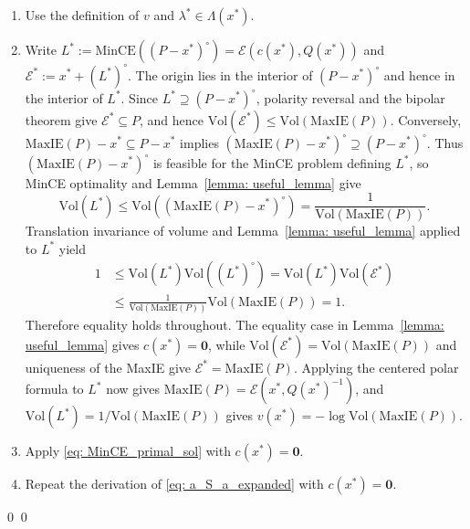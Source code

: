 \documentclass[smallextended]{svjour3}
\let\springerproof\proof
\let\endspringerproof\endproof
\renewenvironment{proof}{\springerproof}{%
  \ifhmode\qed\else\leavevmode\qed\fi\endspringerproof}
\newcommand{\V}{{\mathrm{Vol}}}
\newcommand{\E}{\mathcal{E}}
\newcommand{\MaxIE}{\mathrm{MaxIE}}
\begin{document}
\begin{proof}
\begin{enumerate}
    \item Use the definition of $v$ and $\lambda^*\in\Lambda(x^*)$.
    \item Write $ L^*:=\mathrm{MinCE}((P-x^*)^\circ)=\E(c(x^*),Q(x^*))$ and $\E^*:=x^*+(L^*)^\circ$.
    The origin lies in the interior of $(P-x^*)^\circ$ and hence in the
    interior of $L^*$.
    Since $L^*\supseteq(P-x^*)^\circ$, polarity reversal and the bipolar
    theorem give $\E^*\subseteq P$, and hence
    $\V(\E^*)\leq\V(\MaxIE(P))$. Conversely,
    $\MaxIE(P)-x^*\subseteq P-x^*$ implies
    $(\MaxIE(P)-x^*)^\circ\supseteq(P-x^*)^\circ$. Thus
    $(\MaxIE(P)-x^*)^\circ$ is feasible for the MinCE problem defining $L^*$,
    so MinCE optimality and
    Lemma~\ref{lemma: useful_lemma} give
    \[
        \V(L^*)\leq\V((\MaxIE(P)-x^*)^\circ)
        =\frac{1}{\V(\MaxIE(P))}.
    \]
    Translation invariance of volume and
    Lemma~\ref{lemma: useful_lemma} applied to $L^*$ yield
    \[
    \begin{aligned}
        1
        &\leq\V(L^*)\V((L^*)^\circ)
        =\V(L^*)\V(\E^*)\\
        &\leq\frac{1}{\V(\MaxIE(P))}\V(\MaxIE(P))
        =1.
    \end{aligned}
    \]
    Therefore equality holds throughout. The equality case in
    Lemma~\ref{lemma: useful_lemma} gives $c(x^*)=\mathbf0$, while
    $\V(\E^*)=\V(\MaxIE(P))$ and uniqueness of the MaxIE give
    $\E^*=\MaxIE(P)$. Applying the centered polar formula to $L^*$ now gives
    $\MaxIE(P)=\E(x^*,Q(x^*)^{-1})$, and
    $\V(L^*)=1/\V(\MaxIE(P))$ gives
    $v(x^*)=-\log\V(\MaxIE(P))$.
    \item Apply \eqref{eq: MinCE_primal_sol} with
    $c(x^*)=\mathbf{0}$.
    \item Repeat the derivation of \eqref{eq: a_S_a_expanded} with
    $c(x^*)=\mathbf{0}$.
\end{enumerate}
\end{proof}
\end{document}
